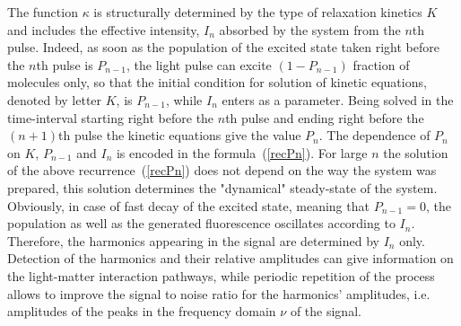 \documentclass[prb,twocolumn,showpacs,epsfig,epsf]{revtex4}
\newcommand{\1}{\mathds{1}}
\begin{document}
The function $\kappa$ is structurally determined by the type of relaxation kinetics $K$ and includes the effective intensity, $I_n$ absorbed by the system from the $n$th pulse. Indeed, as soon as the population of the excited state taken right before the $n$th pulse is $P_{n-1}$, the light pulse can excite $(1-P_{n-1})$ fraction of molecules only, so that the initial condition for solution of kinetic equations, denoted by letter $K$, is $P_{n-1}$, while $I_n$ enters as a parameter. Being solved in the time-interval starting right before the $n$th pulse and ending right before the $(n+1)$th pulse the kinetic equations give the value $P_n$. The dependence of $P_n$ on $K$, $P_{n-1}$ and $I_n$ is encoded in the formula~(\ref{recPn}). For large $n$ the solution of the above recurrence~(\ref{recPn}) does not  depend on the way the system was prepared, this solution determines the "dynamical" steady-state of the system. Obviously, in case of fast decay of the excited state, meaning that $P_{n-1}=0$, the population as well as the generated fluorescence oscillates according to $I_n$. Therefore, the harmonics appearing in the signal are determined by $I_n$ only. Detection of the harmonics and their relative amplitudes can give information on the light-matter interaction pathways, while periodic repetition of the process allows to improve the signal to noise ratio for the harmonics' amplitudes, i.e. amplitudes of the peaks in the frequency domain $\nu$ of the signal. %
\end{document}
